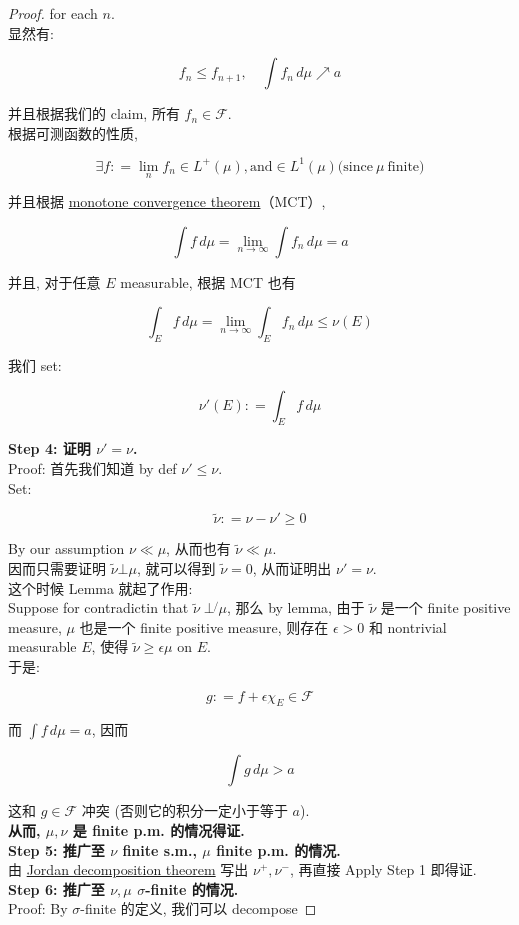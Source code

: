 \documentclass{qlnotes-export}
\begin{document}
\begin{proof}
for each \(n\).\\
显然有:

\[f_{n} \leq f_{n + 1},\quad\int f_{n}\, d\mu\operatorname{\nearrow ︎}a\]

并且根据我们的 claim, 所有 \(f_{n} \in \mathcal{F}\).\\
根据可测函数的性质,

\[\exists f: = \lim\limits_{n}f_{n} \in L^{+}(\mu),\text{and} \in L^{1}(\mu)\text{(since}\ \mu\ \text{finite)}\]

并且根据 \href{https://qiulinfan.github.io/notes/math/measure-theory/\#kn-monotone-convergence-theorem}{monotone convergence theorem}（MCT）,

\[\int f\, d\mu = \lim\limits_{n\rightarrow\infty}\int f_{n}\, d\mu = a\]

并且, 对于任意 \(E\) measurable, 根据 MCT 也有

\[\int_{E}f\, d\mu = \lim\limits_{n\rightarrow\infty}\int_{E}f_{n}\, d\mu \leq \nu(E)\]

我们 set:

\[\nu'(E): = \int_{E}f\, d\mu\]

\textbf{Step 4: 证明 \(\nu' = \nu\).}\\
Proof: 首先我们知道 by def \(\nu' \leq \nu\).\\
Set:

\[\widetilde{\nu}: = \nu - \nu' \geq 0\]

By our assumption \(\nu \ll \mu\), 从而也有 \(\widetilde{\nu} \ll \mu\).\\
因而只需要证明 \(\widetilde{\nu}\bot\mu\), 就可以得到 \(\widetilde{\nu} = 0\), 从而证明出 \(\nu' = \nu\).\\
这个时候 Lemma 就起了作用:\\
Suppose for contradictin that \(\widetilde{\nu}\operatorname{\perp\not{}}\mu\), 那么 by lemma, 由于 \(\widetilde{\nu}\) 是一个 finite positive measure, \(\mu\) 也是一个 finite positive measure, 则存在 \(\epsilon > 0\) 和 nontrivial measurable \(E\), 使得 \(\widetilde{\nu} \geq \epsilon\mu\) on \(E\).\\
于是:

\[g: = f + \epsilon\chi_{E} \in \mathcal{F}\]

而 \(\int f\, d\mu = a\), 因而

\[\int g\, d\mu > a\]

这和 \(g \in \mathcal{F}\) 冲突 (否则它的积分一定小于等于 \(a\)).\\
\textbf{从而, \(\mu,\nu\) 是 finite p.m. 的情况得证.}\\
\textbf{Step 5: 推广至 \(\nu\) finite s.m., \(\mu\) finite p.m. 的情况.}\\
由 \href{https://qiulinfan.github.io/notes/math/measure-theory/\#kn-jordan-decomposition-theorem}{Jordan decomposition theorem} 写出 \(\nu^{+},\nu^{-}\), 再直接 Apply Step 1 即得证.\\
\textbf{Step 6: 推广至 \(\nu,\mu\) \(\sigma\)-finite 的情况.}\\
Proof: By \(\sigma\)-finite 的定义, 我们可以 decompose


\end{proof}
\end{document}

